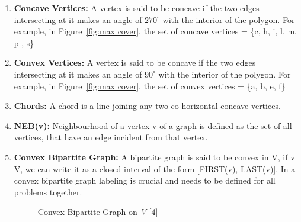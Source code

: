 \flushleft
\begin{enumerate}
	\item \textbf{Concave Vertices:} A vertex is said to be concave if the two edges intersecting at it makes an angle of $270^{\circ}$ with the interior of the polygon. For example, in Figure~\ref{fig:max cover}, the set of concave vertices  = \{c, h, i, l, m, p , s\}
	\item \textbf{Convex Vertices:} A vertex is said to be concave if the two edges intersecting at it makes an angle of $90^{\circ}$ with the interior of the polygon. For example, in Figure~\ref{fig:max cover}, the set of convex vertices = \{a, b, e, f\}
	\item \textbf{Chords: }A chord is a line joining any two co-horizontal concave vertices.
	\item \textbf{NEB(v): }Neighbourhood of a vertex v of a graph is defined as the set of all vertices, that have an edge incident from that vertex.
	\item \textbf{Convex Bipartite Graph: }A bipartite graph is said to be convex in V, if \forall{} v \in{}V, we can write it as a closed interval of the form [FIRST(v), LAST(v)]. In a convex bipartite graph labeling is crucial and needs to be defined for all problems together.
\begin{figure}[h]
	\centering
	\caption{Convex Bipartite Graph on \emph{V} [4]}

\end{figure}
\end{enumerate}
